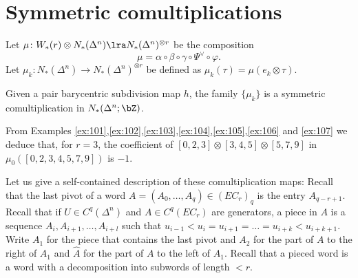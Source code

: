 \section{Symmetric comultiplications} Let $\mu\colon W_*(r)\otimes N_*(\Delta^n)\lra N_*(\Delta^n)^{\otimes r}$ be the composition 
\[
\mu =  \alpha\circ\beta\circ\gamma\circ\Psi^{\vee}\circ\varphi.
\]
Let $\mu_k\colon N_*(\Delta^n)\to N_*(\Delta^n)^{\otimes r}$ be defined as $\mu_k(\tau) = \mu(e_k\otimes \tau)$.
\begin{theorem} Given a pair barycentric subdivision map $h$, the family $\{\mu_k\}$ is a symmetric comultiplication in $N_*(\Delta^n;\bZ)$.
\end{theorem}
\begin{example}
    From Examples \ref{ex:101},\ref{ex:102},\ref{ex:103},\ref{ex:104},\ref{ex:105},\ref{ex:106} and \ref{ex:107} we deduce that, for $r=3$, the coefficient of $[0,2,3]\otimes [3,4,5]\otimes [5,7,9]$ in $\mu_0([0,2,3,4,5,7,9])$ is $-1$.
\end{example}
Let us give a self-contained description of these comultiplication maps: Recall that the last pivot of a word $A = (A_0,\ldots,A_q)\in (EC_r)_q$ is the entry $A_{q-r+1}$. Recall that if $U\in C^q(\Delta^n)$ and $A\in C^q(EC_r)$ are generators, a piece in $A$ is a sequence $A_i,A_{i+1},\ldots,A_{i+l}$ such that $u_{i-1}<u_i = u_{i+1} = \ldots = u_{i+k} < u_{i+k+1}$. Write $A_1$ for the piece that contains the last pivot and $A_2$ for the part of $A$ to the right of $A_1$ and $\hat{A}$ for the part of $A$ to the left of $A_1$. Recall that a pieced word is a word with a decomposition into subwords of length $<r$.

